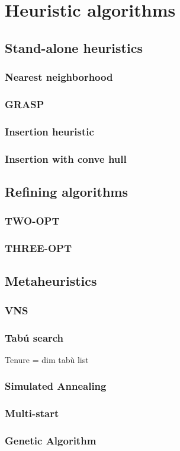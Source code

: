 \chapter{Heuristic algorithms}

\section{Stand-alone heuristics}
\subsection{Nearest neighborhood}
\subsection{GRASP}
\subsection{Insertion heuristic}
\subsection{Insertion with conve hull}

\section{Refining algorithms}
\subsection{TWO-OPT}
\subsection{THREE-OPT}

\section{Metaheuristics}
\subsection{VNS}
\subsection{Tab\'u search}
Tenure = dim tabù list
\subsection{Simulated Annealing}
\subsection{Multi-start}
\subsection{Genetic Algorithm}
